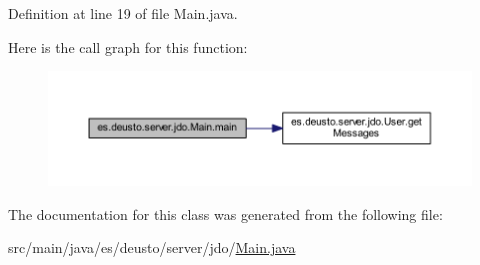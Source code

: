 Definition at line 19 of file Main.\+java.

Here is the call graph for this function\+:
\nopagebreak
\begin{figure}[H]
\begin{center}
\leavevmode
\includegraphics[width=350pt]{classes_1_1deusto_1_1server_1_1jdo_1_1_main_ae5c4387237170481808b08438af03fd9_cgraph}
\end{center}
\end{figure}


The documentation for this class was generated from the following file\+:\begin{DoxyCompactItemize}
\item 
src/main/java/es/deusto/server/jdo/\mbox{\hyperlink{_main_8java}{Main.\+java}}\end{DoxyCompactItemize}
